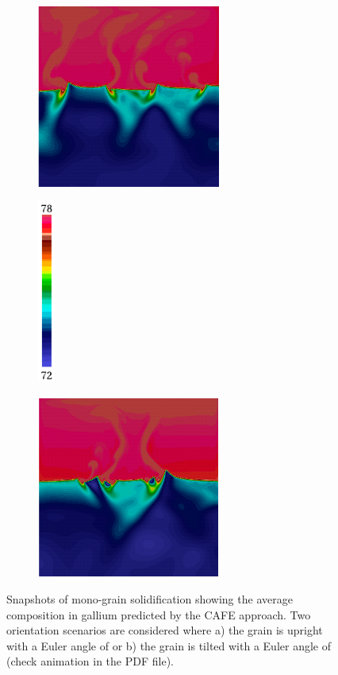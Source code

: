 	{%
	\begin{figure}[htbp]
 			\begin{subfigure}[t]{0.35\textwidth}
			\includegraphics[height=6cm]{Chapter4/Graphics/freckle_cafe/anim_monograin_upright/img0133.png}%
			\caption{}
  			\end{subfigure}
   			\hspace{10mm}
   			\begin{subfigure}[t]{0.15\textwidth}
    		\centering
			\includegraphics[height=6cm]{Chapter4/Graphics/freckle_cafe/cafe_VG_colorbar_annot.pdf}%
  			\end{subfigure}
   			\begin{subfigure}[t]{0.35\textwidth}
    		\centering
			\includegraphics[height=6cm]{Chapter4/Graphics/freckle_cafe/anim_monograin_tilted/img0133.png}%
			\caption{}
  			\end{subfigure}
      		\caption{Snapshots of mono-grain solidification showing the average composition in gallium predicted by the CAFE approach. 
 			Two orientation scenarios are considered where a) the grain is upright with a Euler angle of  
 			or b) the grain is tilted with a Euler angle of  (check animation in the PDF file).}
			\label{fig:animate_monograin}
			\end{figure}
	}
